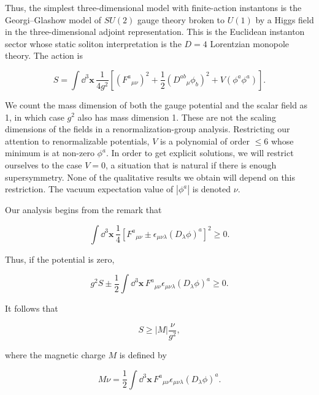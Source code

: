 Thus, the simplest three-dimensional model with finite-action instantons is the
Georgi--Glashow model of $SU(2)$ gauge theory broken to $U(1)$ by a Higgs field
in the three-dimensional adjoint representation. This is the Euclidean
instanton sector whose static soliton interpretation is the $D=4$ Lorentzian
monopole theory. The action is

\[
  S=\int\dd^3\mathbf x\,\frac{1}{4g^2}
  \left[(F^a{}_{\mu\nu})^2+\frac12(D^{ab}{}_{\mu}\phi_b)^2
  +V(\phi^a\phi^a)\right].
\]

We count the mass dimension of both the gauge potential and the scalar field as
1, in which case $g^2$ also has mass dimension 1. These are not the scaling
dimensions of the fields in a renormalization-group analysis. Restricting our
attention to renormalizable potentials, $V$ is a polynomial of order $\leq6$
whose minimum is at non-zero $\phi^a$. In order to get explicit solutions, we
will restrict ourselves to the case $V=0$, a situation that is natural if there
is enough supersymmetry. None of the qualitative results we obtain will depend
on this restriction. The vacuum expectation value of $|\phi^a|$ is denoted $\nu$.

Our analysis begins from the remark that

\[
  \int\dd^3\mathbf x\,\frac14
  \left[F^a{}_{\mu\nu}\pm\epsilon_{\mu\nu\lambda}(D_\lambda\phi)^a\right]^2
  \geq0.
\]

Thus, if the potential is zero,

\[
  g^2S\pm\frac12\int\dd^3\mathbf x\,
  F^a{}_{\mu\nu}\epsilon_{\mu\nu\lambda}(D_\lambda\phi)^a\geq0.
\]

It follows that

\[
  S\geq|M|\frac{\nu}{g^2},
\]

where the magnetic charge $M$ is defined by

\[
  M\nu=\frac12\int\dd^3\mathbf x\,
  F^a{}_{\mu\nu}\epsilon_{\mu\nu\lambda}(D_\lambda\phi)^a.
\]

